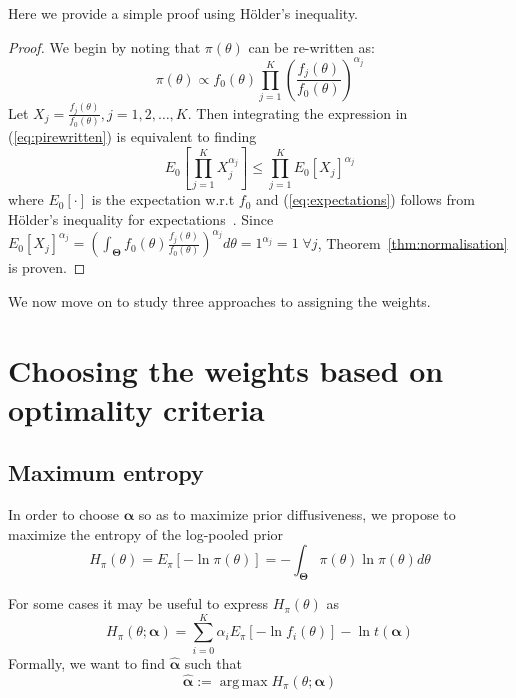 \documentclass[a4paper, notitlepage, 10pt]{article}
\DeclareMathOperator*{\argmax}{arg\,max}
\begin{document}
Here we provide a simple proof using H\"{o}lder's inequality.
\begin{proof}
We begin by noting that $\pi(\theta)$ can be re-written as:
\begin{equation}
\label{eq:pirewritten}
 \pi(\theta) \propto f_0(\theta)\prod_{j=1}^{K} \left(\frac{f_j(\theta)}{f_0(\theta)}\right)^{\alpha_j}
\end{equation}
Let $X_j = \frac{f_j(\theta)}{f_0(\theta)}, j=1, 2,\ldots, K$. 
Then integrating the expression in (\ref{eq:pirewritten}) is equivalent to finding 
\begin{equation}
\label{eq:expectations}
E_{0}\left[\prod_{j=1}^KX_j^{\alpha_j}\right] \leq \prod_{j=1}^KE_{0}[X_j]^{\alpha_j}
\end{equation}
where $E_{0}[\cdot]$ is the expectation w.r.t $f_0$ and (\ref{eq:expectations}) follows from H\"{o}lder's inequality for expectations~\citep{yeh2011}.
Since $ E_{0}[X_j]^{\alpha_j} = \left(\int_{\boldsymbol\Theta}f_0(\theta)\frac{f_j(\theta)}{f_0(\theta)}\right)^{\alpha_j}d\theta=1^{\alpha_j}=1\;\forall j$, Theorem~\ref{thm:normalisation} is proven.
\end{proof}

We now move on to study three approaches to assigning the weights.

\section*{Choosing the weights based on optimality criteria}
\subsection*{Maximum entropy}

In order to choose $\boldsymbol\alpha$ so as to maximize prior 
diffusiveness, we propose to maximize the entropy of 
the log-pooled prior
\begin{equation}
\label{eq:entropypiA}
H_{\pi}(\theta) = E_{\pi}\left[-\ln\pi(\theta) \right] =-\int_{\boldsymbol\Theta}\pi(\theta)\ln\pi(\theta)d\theta 
\end{equation}

For some cases it may be useful to express $H_{\pi}(\theta)$ as
\begin{equation}
\label{eq:entropypiB}
 H_{\pi}(\theta; \boldsymbol\alpha) = \sum_{i=0}^{K} \alpha_i E_{\pi}[ - \ln f_i(\theta)] - \ln t(\boldsymbol\alpha)
\end{equation}
Formally, we want to find $\hat{\boldsymbol\alpha}$ such that
\begin{equation}
\label{eq:argmaxEnt}
 \hat{\boldsymbol\alpha}:= \argmax H_{\pi}(\theta; \boldsymbol\alpha)  
\end{equation}
\end{document}
